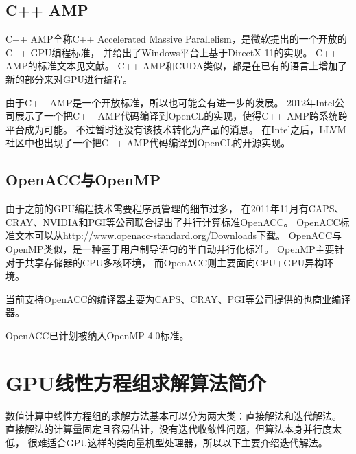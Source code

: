 \subsection{C++ AMP}

C++ AMP全称C++ Accelerated Massive Parallelism，是微软提出的一个开放的C++ GPU编程标准，
并给出了Windows平台上基于DirectX 11的实现。
C++ AMP的标准文本见文献。
C++ AMP和CUDA类似，都是在已有的语言上增加了新的部分来对GPU进行编程。
\cite{cppamp-overview}

由于C++ AMP是一个开放标准，所以也可能会有进一步的发展。
2012年Intel公司展示了一个把C++ AMP代码编译到OpenCL的实现，使得C++ AMP跨系统跨平台成为可能。
\cite{cppamp-opencl}
不过暂时还没有该技术转化为产品的消息。
在Intel之后，LLVM社区中也出现了一个把C++ AMP代码编译到OpenCL的开源实现\cite{llvm-amp-opencl-prototype}。


\subsection{OpenACC与OpenMP}

由于之前的GPU编程技术需要程序员管理的细节过多，
在2011年11月有CAPS、CRAY、NVIDIA和PGI等公司联合提出了并行计算标准OpenACC。
\cite{reyes2012comparative}
OpenACC标准文本可以从\url{http://www.openacc-standard.org/Downloads}下载。
OpenACC与OpenMP类似，是一种基于用户制导语句的半自动并行化标准。
OpenMP主要针对于共享存储器的CPU多核环境，
而OpenACC则主要面向CPU+GPU异构环境。

当前支持OpenACC的编译器主要为CAPS、CRAY、PGI等公司提供的也商业编译器。

OpenACC已计划被纳入OpenMP 4.0标准。\cite{beyer2011openmp}



\section{GPU线性方程组求解算法简介}

数值计算中线性方程组的求解方法基本可以分为两大类：直接解法和迭代解法。
直接解法的计算量固定且容易估计，没有迭代收敛性问题，但算法本身并行度太低，
很难适合GPU这样的类向量机型处理器，所以以下主要介绍迭代解法。

